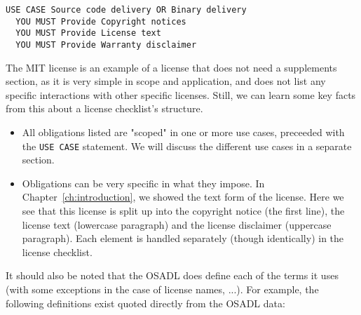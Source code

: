 \begin{verbatim}
USE CASE Source code delivery OR Binary delivery
  YOU MUST Provide Copyright notices
  YOU MUST Provide License text
  YOU MUST Provide Warranty disclaimer
\end{verbatim}

The MIT license is an example of a license that does not need a supplements section, as it is very simple in scope and application, and does not list any specific interactions with other specific licenses. Still, we can learn some key facts from this about a license checklist's structure.

\begin{itemize}
	\item All obligations listed are "scoped" in one or more use cases, preceeded with the \texttt{USE CASE} statement. We will discuss the different use cases in a separate section.
	\item Obligations can be very specific in what they impose. In Chapter~\ref{ch:introduction}, we showed the text form of the license. Here we see that this license is split up into the copyright notice (the first line), the license text (lowercase paragraph) and the license disclaimer (uppercase paragraph). Each element is handled separately (though identically) in the license checklist.
\end{itemize}

It should also be noted that the OSADL does define each of the terms it uses (with some exceptions in the case of license names, ...). For example, the following definitions exist quoted directly from the OSADL data:

